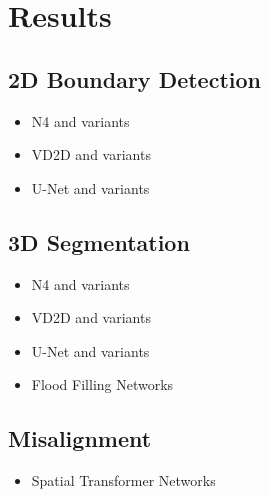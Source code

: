 \chapter{Results}

\section{2D Boundary Detection}

\begin{itemize}
	\item N4 and variants
	\item VD2D and variants
	\item U-Net and variants
\end{itemize}

\section{3D Segmentation}

\begin{itemize}
	\item N4 and variants
	\item VD2D and variants
	\item U-Net and variants
	\item Flood Filling Networks
\end{itemize}

\section{Misalignment}

\begin{itemize}
	\item Spatial Transformer Networks
\end{itemize}